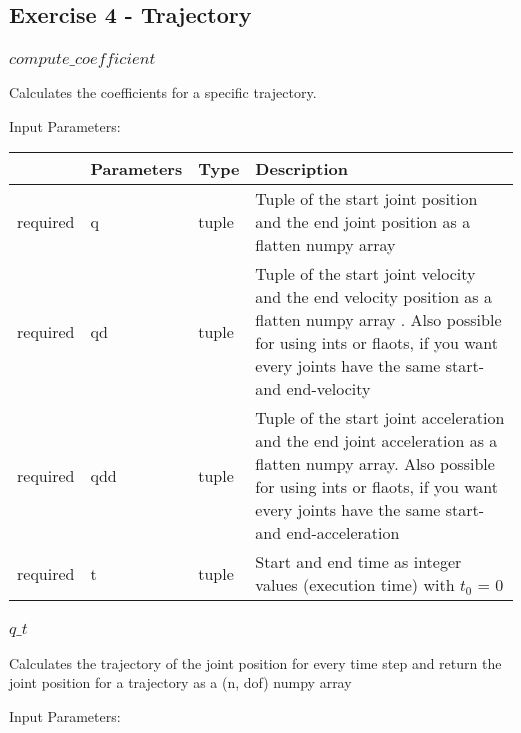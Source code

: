 \documentclass[
	ngerman,
	accentcolor=9c,%
	type=intern,
	marginpar=false
	]{tudapub}
\begin{document}
\vspace{0.5cm}
\subsection{Exercise 4 - Trajectory}
\subsubsection{$compute\_coefficient$}
\noindent Calculates the coefficients for a specific trajectory.

\vspace{0.5cm}
\noindent Input Parameters:
\vspace{0.5cm}

\begin{tabular}{|p{}|p{}|p{}| p{}|}
\hline
 & \textbf{Parameters} & \textbf{Type} & \textbf{Description} \\
\hline
required & q & tuple & Tuple of the start joint position and the end joint position as a flatten numpy array \\
\hline
required & qd & tuple & Tuple of the start joint velocity and the end velocity position as a flatten numpy array . Also possible for using ints or flaots, if you want every joints have the same start- and end-velocity  \\
\hline
required & qdd & tuple & Tuple of the start joint acceleration and the end joint acceleration as a flatten numpy array. Also possible for using ints or flaots, if you want every joints have the same start- and end-acceleration  \\
\hline
required & t & tuple & Start and end time as integer values (execution time) with $t_0$ = 0\\
\hline
\end{tabular}
\vspace{1cm}


\subsubsection{$q\_t$}
\noindent Calculates the trajectory of the joint position for every time step and return the joint position for a trajectory as a (n, dof) numpy array

\vspace{0.5cm}
\noindent Input Parameters:
\vspace{0.5cm}
\end{document}
